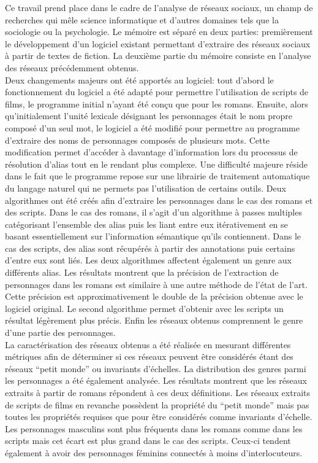\documentclass[a4paper, 12pt]{report}
\begin{document}
Ce travail prend place dans le cadre de l'analyse de réseaux sociaux,
un champ de recherches qui mêle science informatique et d'autres domaines tels que la sociologie ou la psychologie.
Le mémoire est séparé en deux parties: premièrement le développement d'un logiciel existant permettant d'extraire des réseaux sociaux à partir de textes de fiction.
La deuxième partie du mémoire consiste en l'analyse des réseaux précédemment obtenus.\\


Deux changements majeurs ont été apportés au logiciel: tout d'abord le fonctionnement du logiciel a été adapté pour permettre l'utilisation de scripts de films,
le programme initial n'ayant été conçu que pour les romans.
Ensuite, alors qu'initialement l'unité lexicale désignant les personnages était le nom propre composé d'un seul mot,
le logiciel a été modifié pour permettre au programme d'extraire des noms de personnages composés de plusieurs mots.
Cette modification permet d'accéder à davantage d'information lors du processus de résolution d'alias tout en le rendant plus complexe.
Une difficulté majeure réside dans le fait que le programme repose sur une librairie de traitement automatique du langage naturel
qui ne permets pas l'utilisation de certains outils. Deux algorithmes ont été créés afin d'extraire les personnages dans le cas des romans et des scripts.
Dans le cas des romans, il s'agit d'un algorithme à passes multiples catégorisant l'ensemble des alias
puis les liant entre eux itérativement en se basant essentiellement sur l'information sémantique qu'ils contiennent.
Dans le cas des scripts, des alias sont récupérés à partir des annotations puis certains d'entre eux sont liés.
Les deux algorithmes affectent également un genre aux différents alias.
Les résultats montrent que la précision de l'extraction de personnages dans les romans est similaire à une autre méthode de l'état de l'art.
Cette précision est approximativement le double de la précision obtenue avec le logiciel original.
Le second algorithme permet d'obtenir avec les scripts un résultat légèrement plus précis.
Enfin les réseaux obtenus comprennent le genre d'une partie des personnages.\\

La caractérisation des réseaux obtenus a été réalisée en mesurant différentes métriques afin de déterminer si ces réseaux peuvent être considérés étant des réseaux ``petit monde''
ou invariants d'échelles. La distribution des genres parmi les personnages a été également analysée.
Les résultats montrent que les réseaux extraits à partir de romans répondent à ces deux définitions.
Les réseaux extraits de scripts de films en revanche possèdent la propriété du ``petit monde''
mais pas toutes les propriétés requises que pour être considérés comme invariants d'échelle.
Les personnages masculins sont plus fréquents dans les romans comme dans les scripts mais cet écart est plus grand dans le cas des scripts.
Ceux-ci tendent également à avoir des personnages féminins connectés à moins d'interlocuteurs.
\end{document}

